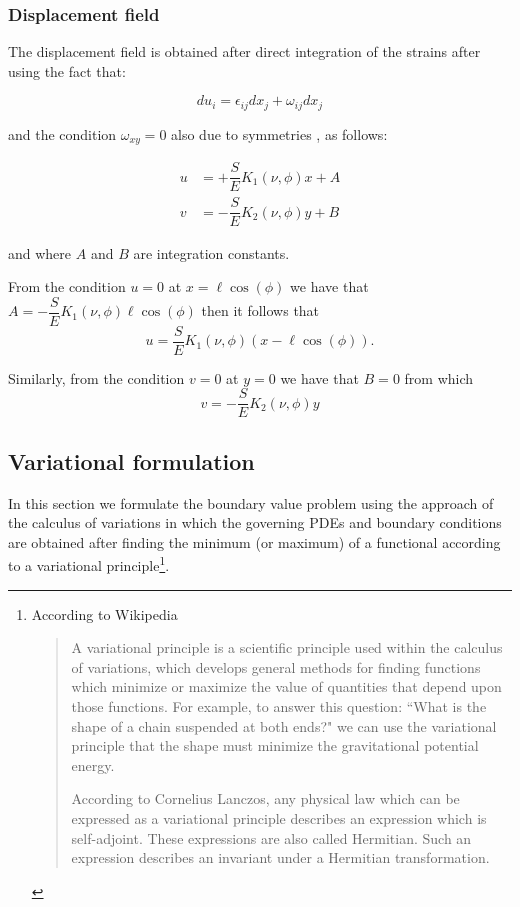 \subsubsection*{Displacement field}
The displacement field is obtained after direct integration of the strains after using the fact that:

\[du_i=\epsilon_{ij}dx_j + \omega_{ij}dx_j\]

and the condition $\omega_{xy}=0$ also due to symmetries , as follows:

\begin{align*}
u &= +\dfrac{S}{E} K_{1}(\nu , \phi)x + A\\
v &= -\dfrac{S}{E} K_{2}(\nu , \phi)y + B
\end{align*}

and where $A$ and $B$ are integration constants.

From the condition $u=0$ at $x=\ell\cos(\phi)$ we have that $A=-\dfrac{S}{E} K_{1}(\nu , \phi)\ell\cos(\phi)$ then it follows that
\[u=\dfrac{S}{E} K_{1}(\nu , \phi)(x-\ell\cos(\phi)).\]

Similarly, from the condition $v=0$ at $y=0$ we have that $B=0$ from which
\[v=-\dfrac{S}{E} K_{2}(\nu , \phi)y\]

\subsection{Variational formulation}
In this section we formulate the boundary value problem using the approach of the calculus of variations in which the governing PDEs and boundary conditions are obtained after finding the minimum (or maximum) of a functional according to a variational principle\footnote{According to Wikipedia \cite{wiki:variational_principle}

\begin{quotation}
A variational principle is a scientific principle used within the calculus of variations, which develops general methods for finding functions which minimize or maximize the value of quantities that depend upon those functions. For example, to answer this question: ``What is the shape of a chain suspended at both ends?" we can use the variational principle that the shape must minimize the gravitational potential energy.

According to Cornelius Lanczos, any physical law which can be expressed as a variational principle describes an expression which is self-adjoint. These expressions are also called Hermitian. Such an expression describes an invariant under a Hermitian transformation.
\end{quotation}}.

